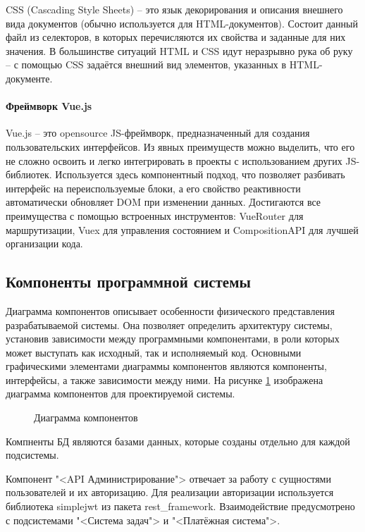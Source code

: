 CSS (Cascading Style Sheets) -- это язык декорирования и описания внешнего вида документов (обычно используется для HTML-документов). Состоит данный файл из селекторов, в которых перечисляются их свойства и заданные для них значения. В большинстве ситуаций HTML и CSS идут неразрывно рука об руку -- с помощью CSS задаётся внешний вид элементов, указанных в HTML-документе.

\paragraph{Фреймворк Vue.js}

Vue.js -- это opensource JS-фреймворк, предназначенный для создания пользовательских интерфейсов. Из явных преимуществ можно выделить, что его не сложно освоить и легко интегрировать в проекты с использованием других JS-библиотек. Используется здесь компонентный подход, что позволяет разбивать интерфейс на переиспользуемые блоки, а его свойство реактивности автоматически обновляет DOM при изменении данных. Достигаются все преимущества с помощью встроенных инструментов: VueRouter для маршрутизации, Vuex для управления состоянием и CompositionAPI для лучшей организации кода.

\subsection{Компоненты программной системы}

Диаграмма компонентов описывает особенности физического представления разрабатываемой системы. Она позволяет определить архитектуру системы, установив зависимости между программными компонентами, в роли которых может выступать как исходный, так и исполняемый код. Основными графическими элементами диаграммы компонентов являются компоненты, интерфейсы, а также зависимости между ними. На рисунке \ref{comp:image} изображена диаграмма компонентов для проектируемой системы.

\begin{figure}[ht]
	\caption{Диаграмма компонентов}
	\label{comp:image}
\end{figure}

Компненты БД являются базами данных, которые созданы отдельно для каждой подсистемы.

Компонент "<API Администрирование"> отвечает за работу с сущностями пользователей и их авторизацию. Для реализации авторизации используется библиотека simplejwt из пакета rest\_framework. Взаимодействие предусмотрено с подсистемами "<Система задач"> и "<Платёжная система">.

